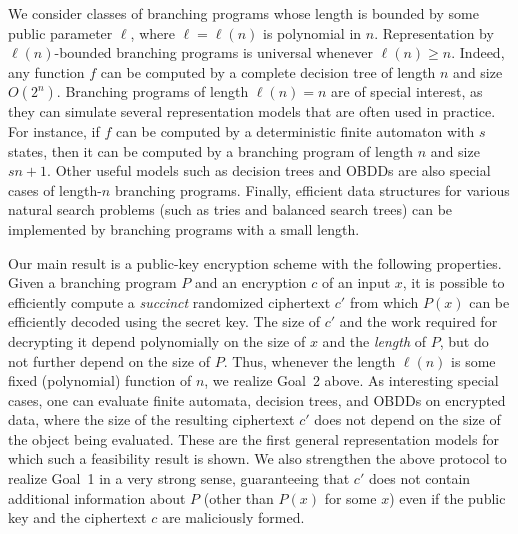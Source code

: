\documentclass[11pt]{article}
\begin{document}
We consider classes of branching programs whose length is bounded by
some public parameter $\ell$, where $\ell=\ell(n)$ is polynomial in
$n$. Representation by $\ell(n)$-bounded branching programs is
universal whenever $\ell(n)\ge n$. Indeed, any function $f$ can be
computed by a complete decision tree of length $n$ and size
$O(2^n)$. Branching programs of length $\ell(n)=n$ are of special
interest, as they can simulate several representation models that
are often used in practice.  For instance, if $f$ can be computed by
a deterministic finite automaton with $s$ states, then it can be
computed by a branching program of length $n$ and size $sn+1$. Other
useful models such as decision trees and OBDDs are also special
cases of length-$n$ branching programs. Finally, efficient data
structures for various natural search problems (such as tries and
balanced search trees) can be implemented by branching programs with
a small length.

Our main result is a public-key encryption scheme with the
following properties. Given a branching program $P$ and an
encryption $c$ of an input $x$, it is possible to efficiently
compute a {\em succinct} randomized ciphertext $c'$ from which
$P(x)$ can be efficiently decoded using the secret key. The size of
$c'$ and the work required for decrypting it depend polynomially on
the size of $x$ and the {\em length} of $P$, but do not further
depend on the size of $P$. Thus, whenever the length $\ell(n)$ is
some fixed (polynomial) function of $n$, we realize Goal~2 above.
As interesting special cases, one can evaluate finite automata,
decision trees, and OBDDs on encrypted data, where the size of the
resulting ciphertext $c'$ does not depend on the size of the object
being evaluated. These are the first general representation models
for which such a feasibility result is shown. We also strengthen
the above protocol to realize Goal~1 in a very strong sense,
guaranteeing that $c'$ does not contain additional information
about $P$ (other than $P(x)$ for some $x$) even if the public key
and the ciphertext $c$ are maliciously formed.
\end{document}
